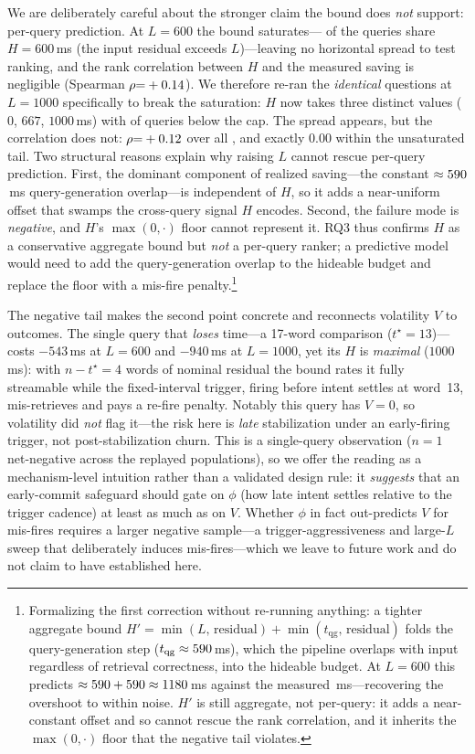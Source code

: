 We are deliberately careful about the stronger claim the bound does \emph{not}
support: per-query prediction. At $L{=}600$ the bound saturates---\nSatLsix{} of the
\rqThreeN{} queries share $H{=}600$\,ms (the input residual exceeds $L$)---leaving no
horizontal spread to test ranking, and the rank correlation between $H$ and the
measured saving is negligible (Spearman $\rho{=}+0.14{}$). We therefore re-ran the
\emph{identical} questions at $L{=}1000$ specifically to break the saturation: $H$
now takes three distinct values ($0$, $667$, $1000$\,ms) with \nTailLk{} of \rqThreeN{}
queries below the cap. The spread appears, but the correlation does not:
$\rho{=}+0.12{}$ over all \rqThreeN{}, and exactly $0.00$ within the unsaturated tail.
Two structural reasons explain why raising $L$ cannot rescue per-query prediction.
First, the dominant component of realized saving---the constant
$\approx590{}$\,ms query-generation overlap---is independent of $H$, so it adds a
near-uniform offset that swamps the cross-query signal $H$ encodes. Second, the
failure mode is \emph{negative}, and $H$'s $\max(0,\cdot)$ floor cannot represent it.
RQ3 thus confirms $H$ as a conservative aggregate bound but \emph{not} a per-query
ranker; a predictive model would need to add the query-generation overlap to the
hideable budget and replace the floor with a mis-fire penalty.\footnote{%
Formalizing the first correction without re-running anything: a tighter aggregate
bound $H' = \min(L,\,\mathrm{residual}) + \min(t_{\mathrm{qg}},\,\mathrm{residual})$
folds the query-generation step ($t_{\mathrm{qg}}\approx590{}$\,ms), which the
pipeline overlaps with input regardless of retrieval correctness, into the hideable
budget. At $L{=}600$ this predicts $\approx590{}+590{}\approx1180$\,ms against
the measured \measSaved{}\,ms---recovering the overshoot to within noise. $H'$ is
still aggregate, not per-query: it adds a near-constant offset and so cannot rescue
the rank correlation, and it inherits the $\max(0,\cdot)$ floor that the negative
tail violates.}

The negative tail makes the second point concrete and reconnects volatility $V$ to
outcomes. The single query that \emph{loses} time---a 17-word comparison
($t^\star{=}13$)---costs $-543$\,ms at $L{=}600$ and $-940$\,ms at $L{=}1000$, yet its
$H$ is \emph{maximal} ($1000$\,ms): with $n-t^\star{=}4$ words of nominal residual the
bound rates it fully streamable while the fixed-interval trigger, firing before intent
settles at word~13, mis-retrieves and pays a re-fire penalty. Notably this query has
$V{=}0$, so volatility did \emph{not} flag it---the risk here is \emph{late}
stabilization under an early-firing trigger, not post-stabilization churn. This is a
single-query observation ($n{=}1$ net-negative across the replayed populations), so we
offer the reading as a mechanism-level intuition rather than a validated design rule:
it \emph{suggests} that an early-commit safeguard should gate on $\phi$ (how late
intent settles relative to the trigger cadence) at least as much as on $V$. Whether
$\phi$ in fact out-predicts $V$ for mis-fires requires a larger negative sample---a
trigger-aggressiveness and large-$L$ sweep that deliberately induces mis-fires---which
we leave to future work and do not claim to have established here.

